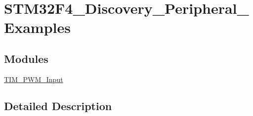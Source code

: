 \hypertarget{group___s_t_m32_f4___discovery___peripheral___examples}{}\section{S\+T\+M32\+F4\+\_\+\+Discovery\+\_\+\+Peripheral\+\_\+\+Examples}
\label{group___s_t_m32_f4___discovery___peripheral___examples}
\subsection*{Modules}
\begin{DoxyCompactItemize}
\item 
\hyperlink{group___t_i_m___p_w_m___input}{T\+I\+M\+\_\+\+P\+W\+M\+\_\+\+Input}
\end{DoxyCompactItemize}


\subsection{Detailed Description}

